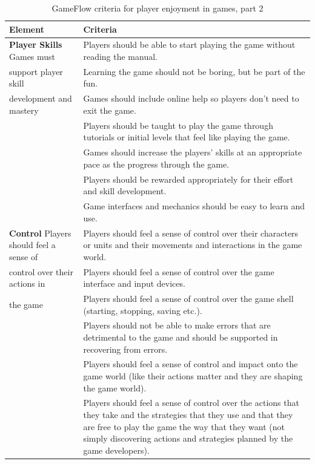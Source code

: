 \begin{table} [H]
\centering
\begin{tabular}{|>{\raggedright}p{}|p{}|}
\hline
\textbf{Element} & \textbf{Criteria} \\ \hline
\textbf{Player Skills} Games must  & Players should be able to start playing the game without reading the manual. \\ \cline{2-2}
support player skill  & Learning the game should not be boring, but be part of the fun. \\ \cline{2-2}
development and mastery & Games should include online help so players don't need to exit the game. \\ \cline{2-2}
& Players should be taught to play the game through tutorials or initial levels that feel like playing the game. \\ \cline{2-2}
& Games should increase the players' skills at an appropriate pace as the progress through the game. \\ \cline{2-2}
& Players should be rewarded appropriately for their effort and skill development. \\ \cline{2-2}
& Game interfaces and mechanics should be easy to learn and use.\\ \hline

\textbf{Control} Players should feel a sense of & Players should feel a sense of control over their characters or units and their movements and interactions in the game world.\\ \cline{2-2}
 control over their actions in  & Players should feel a sense of control over the game interface and input devices. \\ \cline{2-2}
the game & Players should feel a sense of control over the game shell (starting, stopping, saving etc.). \\ \cline{2-2}
& Players should not be able to make errors that are detrimental to the game and should be supported in recovering from errors. \\ \cline{2-2}
& Players should feel a sense of control and impact onto the game world (like their actions matter and they are shaping the game world). \\ \cline{2-2}
& Players should feel a sense of control over the actions that they take and the strategies that they use and that they are free to play the game the way that they want (not simply discovering actions and strategies planned by the game developers).\\ \hline
\end{tabular}
\caption[GameFlow criteria for player enjoyment in games, part 2]{GameFlow criteria for player enjoyment in games, part 2 \cite{sweetser}}
\label{tab:gameFlow2}
\end{table} 

